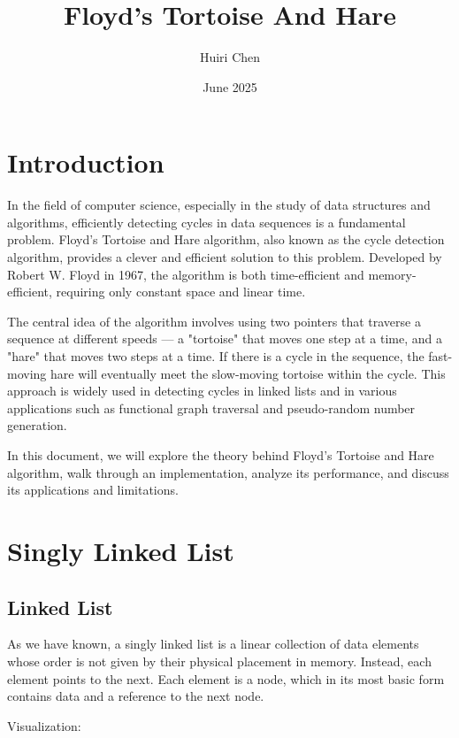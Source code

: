 \documentclass[12pt, letterpaper]{article}
\date{June 2025}
\begin{document}
\title{Floyd's Tortoise And Hare}
\author{Huiri Chen}

\maketitle

\section{Introduction}  
In the field of computer science, especially in the study of data structures and algorithms, efficiently detecting cycles in data sequences is a fundamental problem. Floyd's Tortoise and Hare algorithm, also known as the cycle detection algorithm, provides a clever and efficient solution to this problem. Developed by Robert W. Floyd in 1967, the algorithm is both time-efficient and memory-efficient, requiring only constant space and linear time.

The central idea of the algorithm involves using two pointers that traverse a sequence at different speeds — a "tortoise" that moves one step at a time, and a "hare" that moves two steps at a time. If there is a cycle in the sequence, the fast-moving hare will eventually meet the slow-moving tortoise within the cycle. This approach is widely used in detecting cycles in linked lists and in various applications such as functional graph traversal and pseudo-random number generation.

In this document, we will explore the theory behind Floyd's Tortoise and Hare algorithm, walk through an implementation, analyze its performance, and discuss its applications and limitations.

\section{Singly Linked List}
\subsection{Linked List}
As we have known, a singly linked list is a linear collection of data elements whose order is not given by their physical placement in memory. Instead, each element points to the next. Each element is a node, which in its most basic form contains data and a reference to the next node.

Visualization:
\begin{center}
\end{center}
\end{document}

